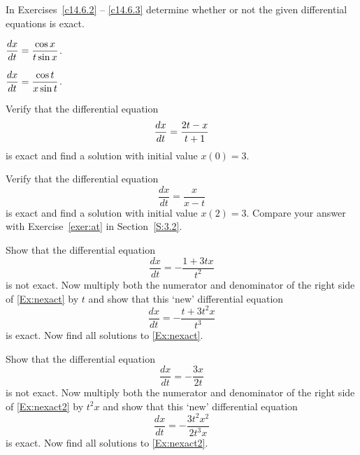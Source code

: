 \documentclass{ximera}
\begin{document}
\EXER

\TEXER

\noindent In Exercises~\ref{c14.6.2} -- \ref{c14.6.3} determine whether or 
not the given differential equations is exact.
\begin{exercise} \label{c14.6.2}
$\displaystyle \frac{dx}{dt} = \frac{\cos x}{t\sin x}$.
\end{exercise}
\begin{exercise} \label{c14.6.3}
$\displaystyle \frac{dx}{dt} = \frac{\cos t}{x\sin t}$.
\end{exercise}

\begin{exercise} \label{c14.6.4}
Verify that the differential equation 
\[
\displaystyle\frac{dx}{dt} = \displaystyle \frac{2t-x}{t+1} 
\]
is exact and find a solution with initial value $x(0) = 3$.
\end{exercise}

\begin{exercise} \label{c14.6.6}
Verify that the differential equation 
\[
\frac{dx}{dt} = \frac{x}{x-t}
\]
is exact and find a solution with initial value $x(2)=3$.   Compare your 
answer with Exercise~\ref{exer:at} in Section~\ref{S:3.2}.
\end{exercise} 

\begin{exercise}  \label{ex:if}
Show that the differential equation
\begin{equation} \label{Ex:nexact}
\frac{dx}{dt} = -\frac{1+3tx}{t^2}
\end{equation}
is not exact.  Now multiply both the numerator and denominator of the 
right side of \eqref{Ex:nexact} by $t$ and show that this `new' differential
equation 
\[
\frac{dx}{dt} = -\frac{t+3t^2x}{t^3}
\]
is exact. Now find all solutions to \eqref{Ex:nexact}.
\end{exercise}

\begin{exercise}  \label{ex:if2}
Show that the differential equation
\begin{equation} \label{Ex:nexact2}
\frac{dx}{dt} = -\frac{3x}{2t}
\end{equation}
is not exact.  Now multiply both the numerator and denominator of the 
right side of \eqref{Ex:nexact2} by $t^2x$ and show that this `new' differential
equation 
\[
\frac{dx}{dt} = -\frac{3t^2x^2}{2t^3x}
\]
is exact.  Now find all solutions to \eqref{Ex:nexact2}.
\end{exercise}
\end{document}
